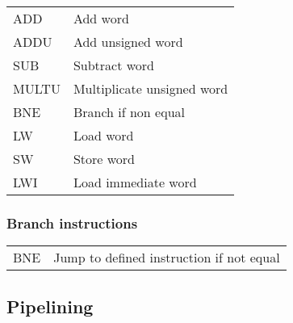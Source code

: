 \documentclass{report}
\begin{document}
\begin{tabular}{@{}ll@{}}
    ADD         & Add word                                              \\
    ADDU        & Add unsigned word                                     \\
    SUB         & Subtract word                                         \\
    MULTU       & Multiplicate unsigned word                            \\
    BNE         & Branch if non equal                                   \\
    LW          & Load word                                             \\
    SW          & Store word                                            \\
	LWI         & Load immediate word                                   \\
\end{tabular}


\subsubsection{Branch instructions}

\begin{tabular}{@{}ll@{}}
    BNE         & Jump to defined instruction if not equal
\end{tabular}

\subsection{Pipelining}
\end{document}
